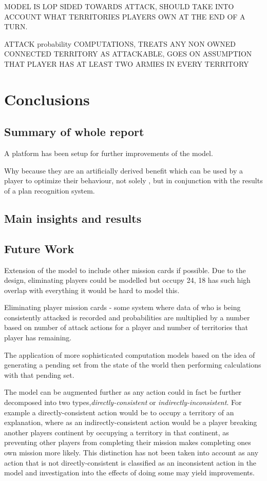 \documentclass[parskip]{cs4rep}
\begin{document}
MODEL IS LOP SIDED TOWARDS ATTACK, SHOULD TAKE INTO ACCOUNT WHAT TERRITORIES PLAYERS OWN AT THE END OF A TURN.

ATTACK probability COMPUTATIONS, TREATS ANY NON OWNED CONNECTED TERRITORY AS ATTACKABLE, GOES ON ASSUMPTION THAT PLAYER HAS AT LEAST TWO ARMIES IN EVERY TERRITORY

\chapter{Conclusions}

\section{Summary of whole report}

A platform has been setup for further improvements of the model.

Why because they are an artificially derived benefit which can be used by a player to optimize their behaviour, not solely , but in conjunction with the results of a plan recognition system.

\section{Main insights and results}

\section{Future Work}

Extension of the model to include other mission cards if possible. Due to the design, eliminating players could be modelled but occupy 24, 18 has such high overlap with everything it would be hard to model this.

Eliminating player mission cards - some system where data of who is being consistently attacked is recorded and probabilities are multiplied by a number based on number of attack actions for a player and number of territories that player has remaining.

The application of more sophisticated computation models based on the idea of generating a pending set from the state of the world then performing calculations with that pending set.

The model can be augmented further as any action could in fact be further decomposed into two types,\textit{directly-consistent} or \textit{indirectly-inconsistent}. For example a directly-consistent action would be to occupy a territory of an explanation, where as an indirectly-consistent action would be a player breaking another players continent by occupying a territory in that continent, as preventing other players from completing their mission makes completing ones own mission more likely. This distinction has not been taken into account as any action that is not directly-consistent is classified as an inconsistent action in the model and investigation into the effects of doing some may yield improvements.
\end{document}
